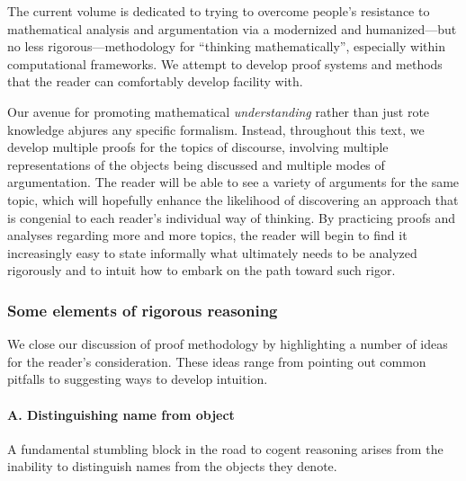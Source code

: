 \bigskip

The current volume is dedicated to trying to overcome people's
resistance to mathematical analysis and argumentation via a modernized
and humanized---but no less rigorous---methodology for ``thinking
mathematically'', especially within computational frameworks.  We
attempt to develop proof systems and methods that the reader can
comfortably develop facility with.

Our avenue for promoting mathematical {\em understanding} rather than
just rote knowledge abjures any specific formalism.  Instead,
throughout this text, we develop multiple proofs for the topics of
discourse, involving multiple representations of the objects being
discussed and multiple modes of argumentation.  The reader will be
able to see a variety of arguments for the same topic, which will
hopefully enhance the likelihood of discovering an approach that is
congenial to each reader's individual way of thinking.  By practicing
proofs and analyses regarding more and more topics, the reader will
begin to find it increasingly easy to state informally what ultimately
needs to be analyzed rigorously and to intuit how to embark on the
path toward such rigor.


\subsubsection{Some elements of rigorous reasoning}
\label{sec:elements-of-reasoning}

We close our discussion of proof methodology by highlighting a number
of ideas for the reader's consideration.  These ideas range from
pointing out common pitfalls to suggesting ways to develop intuition.

\medskip

\paragraph{\small\sf A. Distinguishing name from object}

A fundamental stumbling block in the road to cogent reasoning arises
from the inability to distinguish names from the objects they denote.

